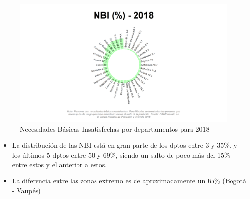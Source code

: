     \begin{figure}[H]
        \caption{Necesidades Básicas Insatisfechas por departamentos para 2018 \label{map_result_2} }
        \begin{center}
        \includegraphics[width=\textwidth,keepaspectratio]{img/var_273_static.png}
        \end{center}
    \end{figure}
            \begin{itemize}
                    \item La distribución de las NBI está en gran parte de los dptos entre 3 y 35\%, y los últimos 5 dptos entre 50 y 69\%, siendo un salto de poco más del 15\% entre estos y el anterior a estos.
                    \item La diferencia entre las zonas extremo es de aproximadamente un 65\% (Bogotá - Vaupés)
                    \end{itemize}

